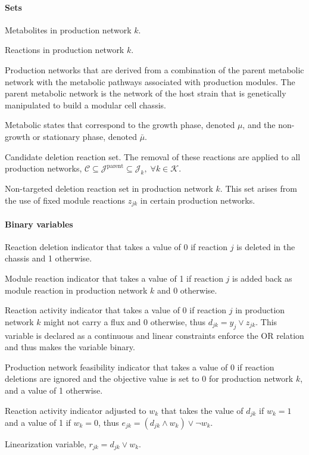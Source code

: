 \paragraph{Sets}
\begin{description}[leftmargin=1.5cm, style=nextline, itemindent=-10pt]
\item[$\mathcal{I}_k$] Metabolites in production network $k$.
\item[$\mathcal{J}_k$] Reactions in production network $k$.
\item[$\mathcal{K}$]  Production networks that are derived from a combination of the parent metabolic network with the metabolic pathways associated with production modules. The parent metabolic network is the network of the host strain that is genetically manipulated to build a modular cell chassis.
\item[$\mathcal{M}$] Metabolic states that correspond to the growth phase, denoted $\mu$, and the non-growth or stationary phase, denoted $\bar{\mu}$.
\item[$\mathcal{C}$] Candidate deletion reaction set. The removal of these reactions are applied to all production networks, $\mathcal{C} \subseteq \mathcal{J}^{\textrm{parent}} \subseteq \mathcal{J}_k, \; \forall k \in \mathcal{K}$.
\item[$\mathcal{N}_k$] Non-targeted deletion reaction set in production network $k$. This set arises from the use of fixed module reactions $z_{jk}$ in certain production networks.
\end{description}

\paragraph{Binary variables}
\begin{description}[leftmargin=1.5cm, style=nextline, itemindent=-10pt]
\item[$y_j$] Reaction deletion indicator that takes a value of 0 if reaction $j$ is deleted in the chassis and 1 otherwise.
\item[$z_{jk}$] Module reaction indicator that takes a value of 1 if reaction $j$ is added back as module reaction in production network $k$ and 0 otherwise.
\item[$d_{jk}$] Reaction activity indicator that takes a value of 0 if reaction $j$ in production network $k$ might not carry a flux and 0 otherwise, thus $d_{jk} = y_j \lor z_{jk}$. This variable is declared as a continuous and linear constraints enforce the OR relation and thus makes the variable binary.
\item[$w_k$] Production network feasibility indicator that takes a value of 0 if reaction deletions are ignored and the objective value is set to 0 for production network $k$, and a value of  1 otherwise.
\item[$e_{jk}$]  Reaction activity indicator adjusted to $w_k$ that takes the value of $d_{jk}$ if $w_k=1$ and a value of 1 if $w_k=0$, thus $e_{jk}=(d_{jk}\land w_k) \lor \lnot w_k$.
\item[$r_{jk}$] Linearization variable, $r_{jk} = d_{jk} \lor w_k.$
\end{description}

